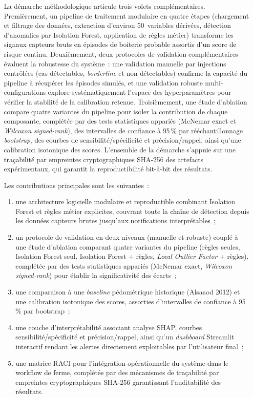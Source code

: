 \begin{introduction}
La démarche méthodologique articule trois volets complémentaires. Premièrement,
un pipeline de traitement modulaire en quatre étapes (chargement et filtrage des
données, extraction d'environ 50~variables dérivées, détection d'anomalies par
Isolation Forest, application de règles métier) transforme les signaux capteurs
bruts en épisodes de boiterie probable assortis d'un score de risque continu.
Deuxièmement, deux protocoles de validation complémentaires évaluent la robustesse du
système~: une validation manuelle par injections contrôlées (cas détectables, \textit{borderline}
et non-détectables) confirme la capacité du pipeline à récupérer les épisodes simulés,
et une validation robuste multi-configurations explore systématiquement l'espace des
hyperparamètres pour vérifier la stabilité de la calibration retenue. Troisièmement,
une étude d'ablation compare quatre variantes du pipeline pour isoler la contribution
de chaque composante, complétée par des tests statistiques appariés (McNemar exact et
\textit{Wilcoxon signed-rank}), des intervalles de confiance à 95\,\% par
rééchantillonnage \textit{bootstrap}, des courbes de sensibilité/spécificité et
précision/rappel, ainsi qu'une calibration isotonique des scores. L'ensemble de la
démarche s'appuie sur une traçabilité par empreintes cryptographiques SHA-256 des
artefacts expérimentaux, qui garantit la reproductibilité bit-à-bit des résultats.

Les contributions principales sont les suivantes~:
\begin{enumerate}
  \item une architecture logicielle modulaire et reproductible combinant
  Isolation Forest et règles métier explicites, couvrant toute la chaîne de
  détection depuis les données capteurs brutes jusqu'aux notifications interprétables~;
  \item un protocole de validation en deux niveaux (manuelle et robuste) couplé à une
  étude d'ablation comparant quatre variantes du pipeline (règles seules,
  Isolation Forest seul, Isolation Forest + règles, \textit{Local
  Outlier Factor} + règles), complétée par des tests statistiques appariés (McNemar
  exact, \textit{Wilcoxon signed-rank}) pour établir la significativité des écarts~;
  \item une comparaison à une \textit{baseline} pédométrique historique
  (Alsaaod 2012) et une calibration isotonique des scores, assorties d'intervalles de
  confiance à 95\,\% par bootstrap~;
  \item une couche d'interprétabilité associant analyse SHAP, courbes
  sensibilité/spécificité et précision/rappel, ainsi qu'un \textit{dashboard} Streamlit
  interactif rendant les alertes directement exploitables par l'utilisateur final~;
  \item une matrice RACI pour l'intégration opérationnelle du système dans le
  workflow de ferme, complétée par des mécanismes de traçabilité par
  empreintes cryptographiques SHA-256 garantissant l'auditabilité des résultats.
\end{enumerate}


\end{introduction}

